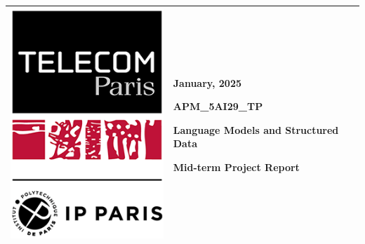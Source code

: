\documentclass[12pt,a4paper]{article}
\begin{document}
\begin{center}
    \begin{tabular}{|p{}|p{}|}
        \hline
        {
            \vspace{0cm} %
            \centerline{\includegraphics[width=\linewidth]{tp-ipp.png}}
        }
         & {
                \vspace{0cm} %
                \centering
                \large
                {\hfill January, 2025}

                \vspace*{.5cm}
                \textbf{APM\_5AI29\_TP}

                \vspace*{.5cm}
                \setstretch{1.5}
                {\Large\textbf{Language Models and Structured Data}}

                \vspace*{.5cm}
                Mid-term Project Report

                \vspace*{1cm}
        }    \\
        \hline
    \end{tabular}
\end{center}
\end{document}

